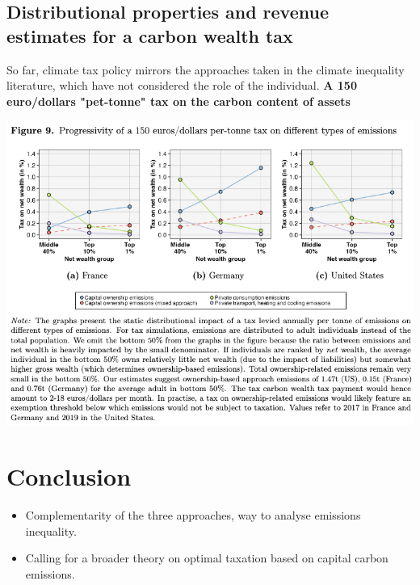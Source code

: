 \documentclass[10pt]{beamer}
\begin{document}
\subsection{Distributional properties and revenue estimates for a carbon wealth tax}
\begin{frame}{\subsecname}
    So far, climate tax policy mirrors the approaches taken in the climate inequality literature, which have not considered the role of the individual.
    \textbf{A 150 euro/dollars "pet-tonne" tax on the carbon content of assets}
    \begin{center}
        \includegraphics[width=1\textwidth]{../Figures/Figure_9.png}
    \end{center}
\end{frame}


\section{Conclusion}
\begin{frame}{\secname}
    \begin{itemize}
        \item Complementarity of the three approaches, way to analyse emissions inequality.
        \item Calling for a broader theory on optimal taxation based on capital carbon emissions. 
    \end{itemize}
\end{frame}
\end{document}
